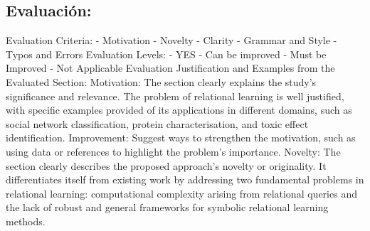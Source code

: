 \documentclass{article}%
\begin{document}
\subsection{Evaluación:}%
\label{subsec:Evaluacin}%
 Evaluation Criteria:\newline%
\newline%
{-} Motivation\newline%
{-} Novelty\newline%
{-} Clarity\newline%
{-} Grammar and Style\newline%
{-} Typos and Errors\newline%
\newline%
Evaluation Levels:\newline%
\newline%
{-} YES\newline%
{-} Can be improved\newline%
{-} Must be Improved\newline%
{-} Not Applicable\newline%
\newline%
Evaluation Justification and Examples from the Evaluated Section:\newline%
\newline%
Motivation:\newline%
\newline%
The section clearly explains the study's significance and relevance. The problem of relational learning is well justified, with specific examples provided of its applications in different domains, such as social network classification, protein characterisation, and toxic effect identification.\newline%
\newline%
Improvement:\newline%
\newline%
Suggest ways to strengthen the motivation, such as using data or references to highlight the problem's importance.\newline%
\newline%
Novelty:\newline%
\newline%
The section clearly describes the proposed approach's novelty or originality. It differentiates itself from existing work by addressing two fundamental problems in relational learning: computational complexity arising from relational queries and the lack of robust and general frameworks for symbolic relational learning methods.\newline%
\end{document}
